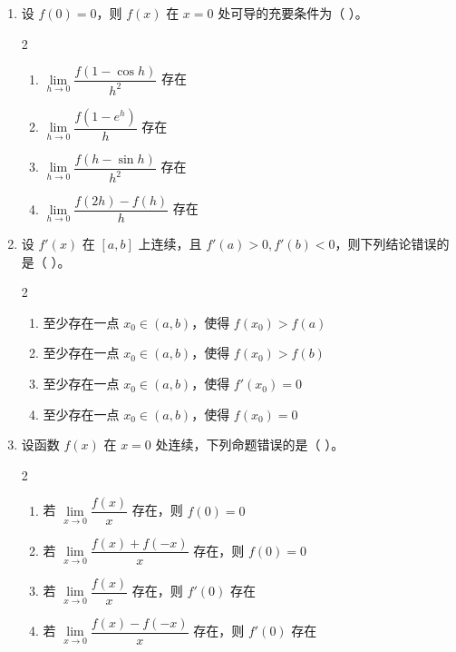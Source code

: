 \begin{enumerate}[label=\textbf{\arabic*.}, itemsep=4.7cm]
    \item 设 $f(0) = 0$，则 $f(x)$ 在 $x=0$ 处可导的充要条件为（ \quad ）。
    \begin{multicols}{2}
        \begin{enumerate}[label=(\Alph*)]
            \item $\lim\limits_{h \to 0} \dfrac{f(1 - \cos h)}{h^2}$ 存在
            \item $\lim\limits_{h \to 0} \dfrac{f(1 - e^h)}{h}$ 存在
            \item $\lim\limits_{h \to 0} \dfrac{f(h - \sin h)}{h^2}$ 存在
            \item $\lim\limits_{h \to 0} \dfrac{f(2h) - f(h)}{h}$ 存在
        \end{enumerate}
    \end{multicols}

    \item 设 $f'(x)$ 在 $[a, b]$ 上连续，且 $f'(a) > 0, f'(b) < 0$，则下列结论错误的是（ \quad ）。
    \begin{multicols}{2}
        \begin{enumerate}[label=(\Alph*)]
            \item 至少存在一点 $x_0 \in (a, b)$，使得 $f(x_0) > f(a)$
            \item 至少存在一点 $x_0 \in (a, b)$，使得 $f(x_0) > f(b)$
            \item 至少存在一点 $x_0 \in (a, b)$，使得 $f'(x_0) = 0$
            \item 至少存在一点 $x_0 \in (a, b)$，使得 $f(x_0) = 0$
        \end{enumerate}
    \end{multicols}

    \item 设函数 $f(x)$ 在 $x=0$ 处连续，下列命题错误的是（ \quad ）。
    \begin{multicols}{2}
        \begin{enumerate}[label=(\Alph*)]
            \item 若 $\lim\limits_{x \to 0} \dfrac{f(x)}{x}$ 存在，则 $f(0) = 0$
            \item 若 $\lim\limits_{x \to 0} \dfrac{f(x) + f(-x)}{x}$ 存在，则 $f(0) = 0$
            \item 若 $\lim\limits_{x \to 0} \dfrac{f(x)}{x}$ 存在，则 $f'(0)$ 存在
            \item 若 $\lim\limits_{x \to 0} \dfrac{f(x) - f(-x)}{x}$ 存在，则 $f'(0)$ 存在
        \end{enumerate}
    \end{multicols}


\end{enumerate}
